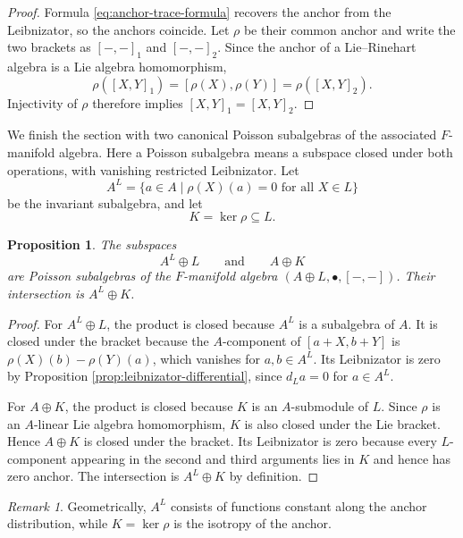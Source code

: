 \documentclass[12pt,reqno]{amsart}
\newtheorem{proposition}[theorem]{Proposition}
\theoremstyle{definition}
\theoremstyle{remark}
\newtheorem{remark}[theorem]{Remark}
\begin{document}
	\begin{proof}
		Formula \eqref{eq:anchor-trace-formula} recovers the anchor from the
		Leibnizator, so the anchors coincide.  Let $\rho$ be their common anchor and
		write the two brackets as $[-,-]_1$ and $[-,-]_2$.  Since the anchor of a
		Lie--Rinehart algebra is a Lie algebra homomorphism,
		\[
		\rho([X,Y]_1)=[\rho(X),\rho(Y)]=\rho([X,Y]_2).
		\]
		Injectivity of $\rho$ therefore implies $[X,Y]_1=[X,Y]_2$.
	\end{proof}
	

	
	We finish the section with two canonical Poisson subalgebras of the associated
	$F$-manifold algebra.  Here a Poisson subalgebra means a subspace closed under
	both operations, with vanishing restricted Leibnizator.  Let
	\[
	A^L=\{a\in A\mid \rho(X)(a)=0\text{ for all }X\in L\}
	\]
	be the invariant subalgebra, and let
	\[
	K=\ker\rho\subseteq L.
	\]
	
	\begin{proposition}\label{prop:Poisson-subalgebras}
		The subspaces
		\[
		A^L\oplus L
		\qquad\text{and}\qquad
		A\oplus K
		\]
		are Poisson subalgebras of the $F$-manifold algebra
		$(A\oplus L,\bullet,[-,-])$.  Their intersection is $A^L\oplus K$.
	\end{proposition}
	
	\begin{proof}
		For \(A^L\oplus L\), the product is closed because \(A^L\) is a subalgebra of
		\(A\).  It is closed under the bracket because the \(A\)-component of
		\([a+X,b+Y]\) is
		$\rho(X)(b)-\rho(Y)(a)$, which vanishes for $a,b\in A^L$.  Its Leibnizator
		is zero by Proposition \ref{prop:leibnizator-differential}, since $d_La=0$ for
		$a\in A^L$.
		
		For \(A\oplus K\), the product is closed because \(K\) is an \(A\)-submodule
		of \(L\).  Since \(\rho\) is an \(A\)-linear Lie algebra homomorphism, \(K\)
		is also closed under the Lie bracket.  Hence \(A\oplus K\) is closed under the
		bracket.  Its Leibnizator is zero because every \(L\)-component appearing in
		the second and third arguments lies in \(K\) and hence has zero anchor.  The
		intersection is \(A^L\oplus K\) by definition.
	\end{proof}
	
	\begin{remark}
		Geometrically, $A^L$ consists of functions constant along the anchor
		distribution, while $K=\ker\rho$ is the isotropy of the anchor.
	\end{remark}
	
\end{document}
